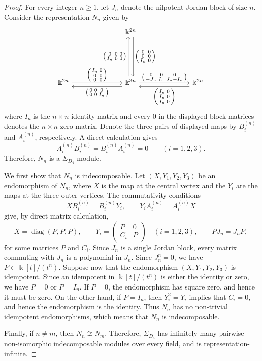 \documentclass[a4paper,leqno]{amsart}
\begin{document}
\begin{proof}
For every integer $n\geq1$, let $J_n$ denote the nilpotent Jordan block of size $n$.  Consider the representation $N_n$ given by
\[
\begin{tikzcd}[column sep=large]
& & \Bbbk^{2n}
\arrow[dd, "\BTwoN", shift left=0.8ex]
& & \\[1em]
& & & & \\[1em]
\Bbbk^{2n}
\arrow[rr, "\BOneN"]
& &
\Bbbk^{3n}
\arrow[ll, "\AOneN", shift left=1.2ex]
\arrow[uu, "\ATwoN", shift left=0.8ex]
\arrow[rr, "\AThreeN"]
& &
\Bbbk^{2n}
\arrow[ll, "\BThreeN", shift left=1.2ex]
\end{tikzcd}
\]
where $I_n$ is the $n\times n$ identity matrix and every $0$ in the
displayed block matrices denotes the $n\times n$ zero matrix.  Denote
the three pairs of displayed maps by $B_i^{(n)}$ and $A_i^{(n)}$,
respectively.  A direct calculation gives
\[
A_i^{(n)}B_i^{(n)}
=
B_i^{(n)}A_i^{(n)}
=0
\qquad (i=1,2,3).
\]
Therefore, $N_n$ is a $\Sigma_{D_4}$-module.

We first show that $N_n$ is indecomposable.  Let $(X,Y_1,Y_2,Y_3)$
be an endomorphism of $N_n$, where $X$ is the map at the central
vertex and the $Y_i$ are the maps at the three outer vertices.  The
commutativity conditions
\[
XB_i^{(n)}=B_i^{(n)}Y_i,
\qquad
Y_iA_i^{(n)}=A_i^{(n)}X
\]
give, by direct matrix calculation,
\[
X=\operatorname{diag}(P,P,P),
\qquad
Y_i=
\begin{pmatrix}
P&0\\
C_i&P
\end{pmatrix}
\quad (i=1,2,3),
\qquad
PJ_n=J_nP,
\]
for some matrices $P$ and $C_i$. 
Since $J_n$ is a single Jordan block, every matrix commuting with
$J_n$ is a polynomial in $J_n$.  Since $J_n^n=0$, we have $
P\in\Bbbk[t]/(t^n)$.
Suppose now that the endomorphism $(X,Y_1,Y_2,Y_3)$ is idempotent.  Since an 
idempotent in $\Bbbk[t]/(t^n)$ is either the identity or zero, we have $P=0$ or $P=I_n$.  If $P=0$, the
endomorphism has square zero, and hence it must be zero.  On the other hand, if $P=I_n$, then $Y_i^2=Y_i$ implies that $C_i=0$, and hence the endomorphism is the identity.  Thus $N_n$ has no non-trivial
idempotent endomorphisms, which means that $N_n$ is indecomposable.

Finally, if $n\neq m$, then $N_n\not\cong N_m$. Therefore, $\Sigma_{D_4}$ has infinitely many pairwise non-isomorphic indecomposable modules over every field, and is representation-infinite.
\end{proof}

\end{document}
